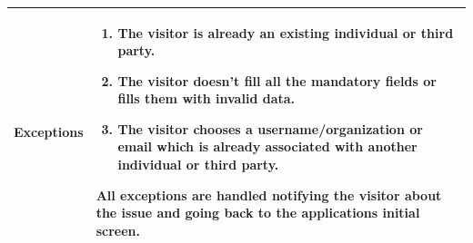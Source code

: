 \documentclass[12pt]{article}
\begin{document}
\begin{center}
\begin{tabular} { |p{}|p{}| }
        \hline
        \textbf{Exceptions} & \begin{enumerate}[topsep=0pt]
                            \setlength{\itemsep}{0.5pt}
                            \item The visitor is already an existing individual or third party. 
                            \item The visitor doesn't fill all the mandatory fields or fills them with invalid data.
                            \item The visitor chooses a username/organization or email which is already associated with another individual or third party.
                            \end{enumerate} 
                            All exceptions are handled notifying the visitor about the issue and going back to the applications initial screen.\\ 
        \hline
    \end{tabular}
\end{center}
\newpage
\end{document}
